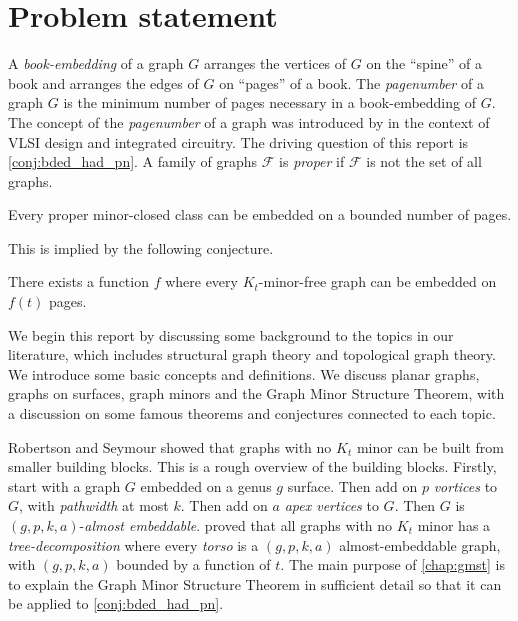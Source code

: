 \section{Problem statement}

A \textit{book-embedding} of a graph $G$ arranges the vertices of $G$ on the ``spine'' of a book and arranges the edges of $G$ on ``pages'' of a book. The \textit{pagenumber} of a graph \(G\) is the minimum number of pages necessary in a book-embedding of \(G\). The concept of the \textit{pagenumber} of a graph was introduced by \textcite{ollmannBookThicknessVarious1973} in the context of VLSI design and integrated circuitry. 
The driving question of this report is \cref{conj:bded_had_pn}. A family of graphs $\mathcal{F}$ is \textit{proper} if $\mathcal{F}$ is not the set of all graphs. 
\begin{conjecture}\label{lem:Minor-Closed_Pagenumber}
	Every proper minor-closed class can be embedded on a bounded number of pages.
\end{conjecture}

This is implied by the following conjecture.

\begin{conjecture}\label{conj:bded_had_pn}
	There exists a function $f$ where every $K_t$-minor-free graph can be embedded on $f(t)$ pages.
\end{conjecture}

We begin this report by discussing some background to the topics in our literature, which includes structural graph theory and topological graph theory. We introduce some basic concepts and definitions. We discuss planar graphs, graphs on surfaces, graph minors and the Graph Minor Structure Theorem, with a discussion on some famous theorems and conjectures connected to each topic. 

Robertson and Seymour showed that graphs with no \(K_t\) minor can be built from smaller building blocks. This is a rough overview of the building blocks. Firstly, start with a graph \(G\) embedded on a genus \(g\) surface. Then add on \(p\) \textit{vortices} to \(G\), with \textit{pathwidth} at most \(k\). Then add on \(a\) \textit{apex vertices} to \(G\). Then \(G\) is \((g, p, k, a)\)-\textit{almost embeddable}. \textcite{robertsonGraphMinorsXVI2003} proved that all graphs with no \(K_t\) minor has a \textit{tree-decomposition} where every \textit{torso} is a \((g, p, k, a)\) almost-embeddable graph, with \((g, p, k, a)\) bounded by a function of \(t\). The main purpose of \cref{chap:gmst} is to explain the Graph Minor Structure Theorem in sufficient detail so that it can be applied to \cref{conj:bded_had_pn}.

